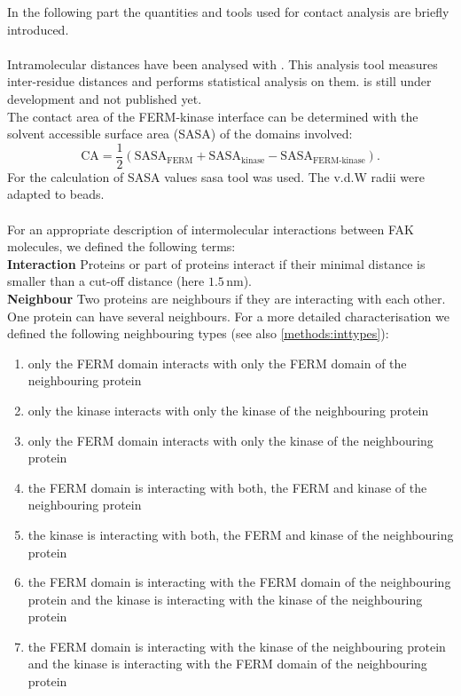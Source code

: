 In the following part the quantities and tools used for contact analysis are briefly introduced.\\
\\
Intramolecular distances have been analysed with \conan{}. This analysis tool measures inter-residue distances and performs statistical analysis on them. \conan{} is still under development and not published yet.\\%
The contact area of the FERM-kinase interface can be determined with the solvent accessible surface area (SASA) \autocite{sasaAlg} of the domains involved:
\begin{equation}
\text{CA} = \frac{1}{2} \left(\text{SASA}_\text{FERM} + \text{SASA}_\text{kinase} - \text{SASA}_\text{FERM-kinase}\right).
\end{equation}
For the calculation of SASA values \gromacs{} sasa tool was used. The v.d.W radii were adapted to \martini{} beads.\\
\\
For an appropriate description of intermolecular interactions between FAK molecules, we defined the following terms:\\
\textbf{Interaction} Proteins or part of proteins interact if their minimal distance is smaller than a cut-off distance (here $1.5\,\si{\nano\metre}$).\\
\textbf{Neighbour} Two proteins are neighbours if they are interacting with each other. One protein can have several neighbours. For a more detailed characterisation we defined the following neighbouring types (see also \autoref{methods:inttypes}):
\begin{enumerate}[label={type \theenumi:}, leftmargin=*]
	\setcounter{enumi}{0}
	\item only the FERM domain interacts with only the FERM domain of the neighbouring protein
	\item only the kinase interacts with only the kinase of the neighbouring protein
	\item only the FERM domain interacts with only the kinase of the neighbouring protein
	\item the FERM domain is interacting with both, the FERM and kinase of the neighbouring protein
	\item the kinase is interacting with both, the FERM and kinase of the neighbouring protein
	\item the FERM domain is interacting with the FERM domain of the neighbouring protein and the kinase is interacting with the kinase of the neighbouring protein
	\item the FERM domain is interacting with the kinase of the neighbouring protein and the kinase is interacting with the FERM domain of the neighbouring protein
\end{enumerate}
